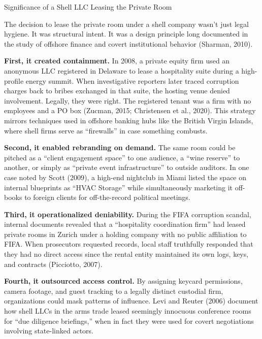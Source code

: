 \begin{TechnicalSidebar}{Significance of a Shell LLC Leasing the Private Room}

  The decision to lease the private room under a shell company wasn’t just legal 
  hygiene. It was structural intent. It was a design principle long documented in the study 
  of offshore finance and covert institutional behavior (Sharman, 2010).

  \medskip

  \textbf{First, it created containment.}  
  In 2008, a private equity firm used an anonymous LLC registered in Delaware to lease a hospitality suite 
  during a high-profile energy summit. When investigative reporters later traced corruption charges back to 
  bribes exchanged in that suite, the hosting venue denied involvement. Legally, they were right. The 
  registered tenant was a firm with no employees and a PO box (Zucman, 2015; Christensen et al., 2020).  
  This strategy mirrors techniques used in offshore banking hubs like the British Virgin Islands, where 
  shell firms serve as “firewalls” in case something combusts.

  \medskip

  \textbf{Second, it enabled rebranding on demand.}  
  The same room could be pitched as a ``client engagement space'' to one audience, a ``wine reserve'' to another, 
  or simply as ``private event infrastructure'' to outside auditors. In one case noted by Scott (2009), 
  a high-end nightclub in Miami listed the space on internal blueprints as “HVAC Storage” while simultaneously 
  marketing it off-books to foreign clients for off-the-record political meetings.

  \medskip

  \textbf{Third, it operationalized deniability.}  
  During the FIFA corruption scandal, internal documents revealed that a ``hospitality coordination firm'' 
  had leased private rooms in Zurich under a holding company with no public affiliation to FIFA. 
  When prosecutors requested records, local staff truthfully responded that they had no direct access since 
  the rental entity maintained its own logs, keys, and contracts (Picciotto, 2007).

  \medskip

  \textbf{Fourth, it outsourced access control.}  
  By assigning keycard permissions, camera footage, and guest tracking to a legally distinct custodial 
  firm, organizations could mask patterns of influence. Levi and Reuter (2006) document how shell LLCs 
  in the arms trade leased seemingly innocuous conference rooms for “due diligence briefings,” 
  when in fact they were used for covert negotiations involving state-linked actors.


\end{TechnicalSidebar}
